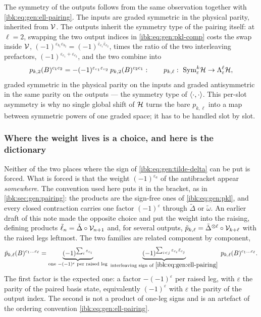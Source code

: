 The symmetry of the outputs follows from the same observation together with \eqref{ibk:eq:gen:ell-pairing}. The inputs are graded symmetric in the physical parity, inherited from ${\mathcal{V}}$. The outputs inherit the symmetry type of the pairing itself: at $\ell=2$, swapping the two output indices in \eqref{ibk:eq:gen:pkl-comp} costs the swap inside ${\mathcal{V}}$, $(-1)^{\varepsilon_{b_1}\varepsilon_{b_2}}=(-1)^{\bar\varepsilon_{c_1}\bar\varepsilon_{c_2}}$, times the ratio of the two interleaving prefactors, $(-1)^{\varepsilon_{c_1}+\varepsilon_{c_2}}$, and the two combine into
\begin{equation}
  \label{ibk:eq:gen:symmetry}
  p_{k,2}(B)^{c_1c_2}
    = -(-1)^{\varepsilon_{c_1}\varepsilon_{c_2}}\,p_{k,2}(B)^{c_2c_1}:
  \qquad
  p_{k,\ell}:\ \mathrm{Sym}^k_{\varepsilon}{\mathcal{H}}\to\Lambda^\ell_{\varepsilon}{\mathcal{H}},
\end{equation}
graded symmetric in the physical parity on the inputs and graded antisymmetric in the same parity on the outputs --- the symmetry type of $\braket{\cdot,\cdot}$. This per-slot asymmetry is why no single global shift of ${\mathcal{H}}$ turns the bare $p_{k,\ell}$ into a map between symmetric powers of one graded space; it has to be handled slot by slot.

\subsubsection{Where the weight lives is a choice, and here is the dictionary}
\label{ibk:sec:gen:convention}

Neither of the two places where the sign of \eqref{ibk:eq:gen:tilde-delta} can be put is forced. What is forced is that the weight $(-1)^{\varepsilon_a}$ of the antibracket appear \emph{somewhere}. The convention used here puts it in the bracket, as in \cref{ibk:sec:gen:pairing}: the products are the sign-free ones of \eqref{ibk:eq:gen:pkl}, and every closed contraction carries one factor $(-1)^\varepsilon$ through $\tilde\Delta$ or $\tilde\omega$. An earlier draft of this note made the opposite choice and put the weight into the raising, defining products $\tilde\ell_n=\tilde\Delta\circ{\mathcal{V}}_{n+1}$ and, for several outputs, $\tilde p_{k,\ell}=\tilde\Delta^{\otimes\ell}\circ{\mathcal{V}}_{k+\ell}$ with the raised legs leftmost. The two families are related component by component,
\begin{equation}
  \label{ibk:eq:gen:dictionary}
  \tilde p_{k,\ell}(B)^{c_1\dots c_\ell}
    = \underbrace{(-1)^{\sum_i\varepsilon_{c_i}}}_{\text{one }-(-1)^{\varepsilon}\text{ per raised leg}}\;
      \underbrace{(-1)^{\sum_{i<j}\varepsilon_{c_i}\bar\varepsilon_{c_j}}}_{\text{interleaving sign of }\eqref{ibk:eq:gen:ell-pairing}}\;
      p_{k,\ell}(B)^{c_1\dots c_\ell}.
\end{equation}
The first factor is the expected one: a factor $-(-1)^{\varepsilon}$ per raised leg, with $\varepsilon$ the parity of the paired basis state, equivalently $(-1)^{\varepsilon}$ with $\varepsilon$ the parity of the output index. The second is not a product of one-leg signs and is an artefact of the ordering convention \eqref{ibk:eq:gen:ell-pairing}.

